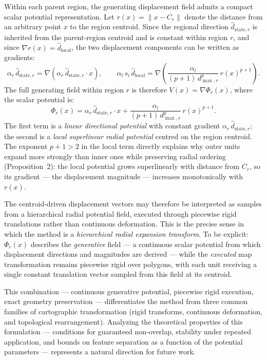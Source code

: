 \documentclass[12pt, a4paper]{article}
\numberwithin{equation}{section}
\begin{document}
Within each parent region, the generating displacement field admits a compact scalar potential representation. Let $r(x) = \|x - C_r\|$ denote the distance from an arbitrary point $x$ to the region centroid. Since the regional direction $\hat{d}_{\text{state},r}$ is inherited from the parent-region centroid and is constant within region $r$, and since $\nabla r(x) = \hat{d}_{\text{local}}$, the two displacement components can be written as gradients:
\[
  \alpha_r\,\hat{d}_{\text{state},r} = \nabla\!\left(\alpha_r\,\hat{d}_{\text{state},r}\cdot x\right), \qquad
  \alpha_l\,s_i\,\hat{d}_{\text{local}} = \nabla\!\left(\frac{\alpha_l}{(p+1)\,d_{\max,r}^p}\,r(x)^{p+1}\right).
\]
The full generating field within region $r$ is therefore $V(x) = \nabla\Phi_r(x)$, where the scalar potential is:
\begin{equation}
  \Phi_r(x) = \alpha_r\,\hat{d}_{\text{state},r}\cdot x + \frac{\alpha_l}{(p+1)\,d_{\max,r}^p}\,r(x)^{p+1}.
  \label{eq:potential}
\end{equation}
The first term is a \emph{linear directional potential} with constant gradient $\alpha_r\,\hat{d}_{\text{state},r}$; the second is a \emph{local superlinear radial potential} centred on the region centroid. The exponent $p+1 > 2$ in the local term directly explains why outer units expand more strongly than inner ones while preserving radial ordering (Proposition~2): the local potential grows superlinearly with distance from $C_r$, so its gradient — the displacement magnitude — increases monotonically with $r(x)$.

The centroid-driven displacement vectors may therefore be interpreted as samples from a hierarchical radial potential field, executed through piecewise rigid translations rather than continuous deformation. This is the precise sense in which the method is a \emph{hierarchical radial expansion transform}. To be explicit: $\Phi_r(x)$ describes the \emph{generative} field --- a continuous scalar potential from which displacement directions and magnitudes are derived --- while the \emph{executed} map transformation remains piecewise rigid over polygons, with each unit receiving a single constant translation vector sampled from this field at its centroid.

This combination --- continuous generative potential, piecewise rigid execution, exact geometry preservation --- differentiates the method from three common families of cartographic transformation (rigid transforms, continuous deformation, and topological rearrangement). Analyzing the theoretical properties of this formulation --- conditions for guaranteed non-overlap, stability under repeated application, and bounds on feature separation as a function of the potential parameters --- represents a natural direction for future work.
\end{document}
